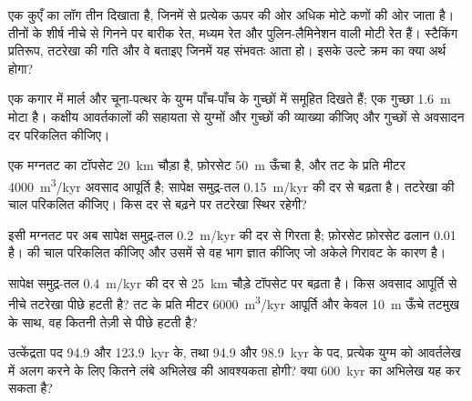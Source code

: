 \begin{exercise}[$\star$]\label{exo:b3:sequence-stratigraphy:3}
एक कुएँ का लॉग तीन  दिखाता है, जिनमें से प्रत्येक ऊपर की ओर अधिक मोटे कणों की ओर जाता है। तीनों के शीर्ष
नीचे से गिनने पर बारीक रेत, मध्यम रेत और पुलिन-लैमिनेशन वाली मोटी रेत हैं।
स्टैकिंग प्रतिरूप, तटरेखा की गति और वे  बताइए जिनमें यह
संभवतः आता हो। इसके उल्टे क्रम का क्या अर्थ होगा?
\end{exercise}

\begin{exercise}[$\star$]\label{exo:b3:sequence-stratigraphy:4}
एक कगार में मार्ल और चूना-पत्थर के युग्म पाँच-पाँच के गुच्छों में समूहित दिखते हैं; एक
गुच्छा \qty{1.6}{m} मोटा है। कक्षीय आवर्तकालों की सहायता से युग्मों और गुच्छों की
व्याख्या कीजिए और गुच्छों से अवसादन दर परिकलित कीजिए।
\end{exercise}

\begin{exercise}[$\star\star$]\label{exo:b3:sequence-stratigraphy:5}
एक मग्नतट का टॉपसेट \qty{20}{km} चौड़ा है, फ़ोरसेट \qty{50}{m} ऊँचा है, और
तट के प्रति मीटर \qty{4000}{m^3/kyr} अवसाद आपूर्ति है; सापेक्ष समुद्र-तल
\qty{0.15}{m/kyr} की दर से बढ़ता है। तटरेखा की चाल परिकलित कीजिए। किस
दर से बढ़ने पर तटरेखा स्थिर रहेगी?
\end{exercise}

\begin{exercise}[$\star\star$]\label{exo:b3:sequence-stratigraphy:6}
इसी मग्नतट पर अब सापेक्ष समुद्र-तल \qty{0.2}{m/kyr} की दर से गिरता है; फ़ोरसेट
फ़ोरसेट ढलान 0.01 है।  की चाल परिकलित कीजिए और
उसमें से वह भाग ज्ञात कीजिए जो अकेले गिरावट के कारण है।
\end{exercise}

\begin{exercise}[$\star\star$]\label{exo:b3:sequence-stratigraphy:7}
सापेक्ष समुद्र-तल \qty{0.4}{m/kyr} की दर से \qty{25}{km} चौड़े टॉपसेट पर बढ़ता है।
किस अवसाद आपूर्ति से नीचे तटरेखा पीछे हटती है? तट के प्रति मीटर
\qty{6000}{m^3/kyr} आपूर्ति और केवल \qty{10}{m} ऊँचे तटमुख के साथ, वह
कितनी तेज़ी से पीछे हटती है?
\end{exercise}

\begin{exercise}[$\star\star$]\label{exo:b3:sequence-stratigraphy:8}
उत्केंद्रता पद 94.9 और \qty{123.9}{kyr} के, तथा 94.9 और
\qty{98.9}{kyr} के पद, प्रत्येक युग्म को आवर्तलेख में अलग करने के लिए कितने लंबे अभिलेख की आवश्यकता होगी?
क्या \qty{600}{kyr} का अभिलेख यह कर सकता है?
\end{exercise}

